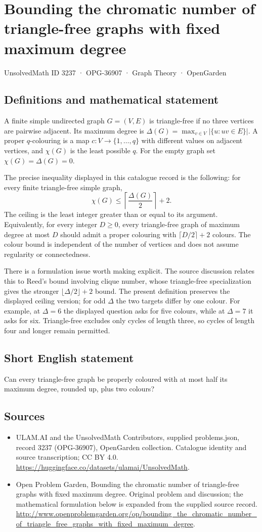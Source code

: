 \documentclass[11pt,a4paper]{article}
\begin{document}
\section*{Bounding the chromatic number of triangle-free graphs with fixed maximum degree}\label{3237}
{\small UnsolvedMath ID 3237 · OPG-36907 · Graph Theory · OpenGarden}
\subsection{Definitions and mathematical statement}
A finite simple undirected graph $G=(V,E)$ is triangle-free if no three
vertices are pairwise adjacent. Its maximum degree is
$\Delta(G)=\max_{v\in V}|\{u:uv\in E\}|$. A proper $q$-colouring is a map
$c:V\to\{1,\ldots,q\}$ with different values on adjacent vertices, and
$\chi(G)$ is the least possible $q$. For the empty graph set
$\chi(G)=\Delta(G)=0$.

The precise inequality displayed in this catalogue record is the following:
for every finite triangle-free simple graph,
\[
                \chi(G)\le\left\lceil\frac{\Delta(G)}2\right\rceil+2.
\]
The ceiling is the least integer greater than or equal to its argument.
Equivalently, for every integer $D\ge0$, every triangle-free graph of
maximum degree at most $D$ should admit a proper colouring with
$\lceil D/2\rceil+2$ colours. The colour bound is independent of the number
of vertices and does not assume regularity or connectedness.

There is a formulation issue worth making explicit. The source discussion
relates this to Reed's bound involving clique number, whose triangle-free
specialization gives the stronger $\lfloor\Delta/2\rfloor+2$ bound. The
present definition preserves the displayed ceiling version; for odd
$\Delta$ the two targets differ by one colour. For example, at $\Delta=6$
the displayed question asks for five colours, while at $\Delta=7$ it asks
for six. Triangle-free excludes only cycles of length three, so cycles of
length four and longer remain permitted.
\subsection{Short English statement}
Can every triangle-free graph be properly coloured with at most half its maximum degree, rounded up, plus two colours?
\subsection{Sources}
\begin{itemize}
\item[S1] ULAM.AI and the UnsolvedMath Contributors, supplied problems.json, record 3237 (OPG-36907), OpenGarden collection. Catalogue identity and source transcription; CC BY 4.0.
\url{https://huggingface.co/datasets/ulamai/UnsolvedMath}.
\item[S2] Open Problem Garden, Bounding the chromatic number of triangle-free graphs with fixed maximum degree. Original problem and discussion; the mathematical formulation below is expanded from the supplied source record.
\url{http://www.openproblemgarden.org/op/bounding_the_chromatic_number_of_triangle_free_graphs_with_fixed_maximum_degree}.
\end{itemize}
\end{document}
